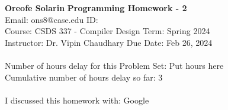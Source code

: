 \documentclass[a4paper, 11pt]{article}
\begin{document}
\noindent
\large\textbf{Oreofe Solarin} \hfill \textbf{Programming Homework - 2}   \\
Email: ons8@case.edu \hfill ID:  \\
\normalsize Course: CSDS 337 - Compiler Design \hfill Term: Spring 2024\\
Instructor: Dr. Vipin Chaudhary \hfill Due Date: Feb 26, 2024 \\ \\
Number of hours delay for this Problem Set: \hfill Put hours here\\
Cumulative number of hours delay so far: \hfill 3 \\ \\
I discussed this homework with: \hfill Google \\
\end{document}
